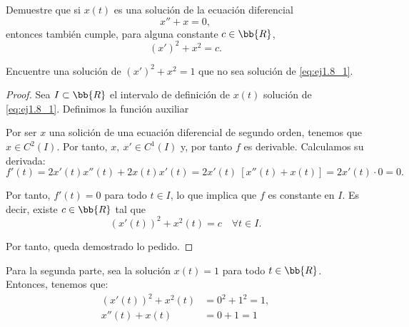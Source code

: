 \begin{ejercicio}
    Demuestre que si \(x(t)\) es una solución de la ecuación diferencial
    \begin{equation}\label{eq:ej1.8_1}
        x'' + x = 0,
    \end{equation}
    entonces también cumple, para alguna constante \(c \in \bb{R}\),
    \begin{equation}\label{eq:ej1.8_2}
        (x')^2 + x^2 = c.
    \end{equation}

    Encuentre una solución de $(x')^2 + x^2 = 1$ que no sea solución de \eqref{eq:ej1.8_1}.\\

    \begin{proof}
        Sea $I\subset \bb{R}$ el intervalo de definición de $x(t)$ solución de \eqref{eq:ej1.8_1}. Definimos la función auxiliar

        Por ser $x$ una solición de una ecuación diferencial de segundo orden, tenemos que $x\in C^2(I)$. Por tanto, $x,~x'\in C^1(I)$ y, por tanto $f$ es derivable. Calculamos su derivada:
        \begin{equation*}
            f'(t) = 2x'(t)x''(t) + 2x(t)x'(t) = 2x'(t)~\left[ x''(t) + x(t) \right] = 2x'(t)\cdot 0 = 0.
        \end{equation*}

        Por tanto, $f'(t)=0$ para todo $t\in I$, lo que implica que $f$ es constante en $I$. Es decir, existe $c\in \bb{R}$ tal que
        \begin{equation*}
            (x'(t))^2 + x^2(t) = c \quad \forall t\in I.
        \end{equation*}

        Por tanto, queda demostrado lo pedido.
    \end{proof}

    Para la segunda parte, sea la solución $x(t) = 1$ para todo $t\in \bb{R}$. Entonces, tenemos que:
    \begin{align*}
        (x'(t))^2 + x^2(t) &= 0^2 + 1^2 = 1,\\
        x''(t) + x(t) &= 0 + 1 = 1
    \end{align*}
\end{ejercicio}



